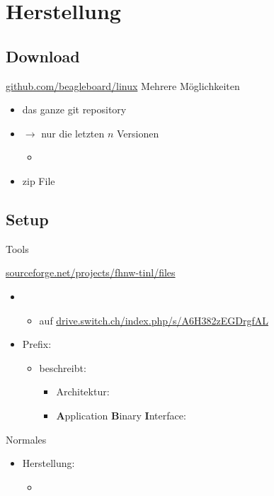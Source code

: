 \section{Herstellung}

\subsection{Download}
\begin{frame}{\url{github.com/beagleboard/linux}}
             {Mehrere Möglichkeiten}
 \begin{itemize}
  \item das ganze git repository
  \item {$\to$ \Large nur die letzten $n$ Versionen }
  \begin{itemize}
   \item {}
  \end{itemize}
  \item zip File 
 \end{itemize}
\end{frame}

\subsection{Setup}
\begin{frame}{Tools}%
 \begin{description}[toolchain]
 
  \item[toolchain] {\small \url{sourceforge.net/projects/fhnw-tinl/files}}
   \begin{itemize}
    \item {}
    \begin{itemize}
     \item auf \url{drive.switch.ch/index.php/s/A6H382zEGDrgfAL}
    \end{itemize}
    \item Prefix: 
    \begin{itemize}
     \item beschreibt:
     \begin{itemize}
      \item Architektur: 
      \item {\bf A}pplication {\bf B}inary {\bf I}nterface: 
     \end{itemize}
    \end{itemize}
    \end{itemize}
  \item[make] Normales 
  \begin{itemize}
   \item {} Herstellung:
   \begin{itemize}
    \item {}
   \end{itemize}
  \end{itemize}
 \end{description}
\end{frame}

